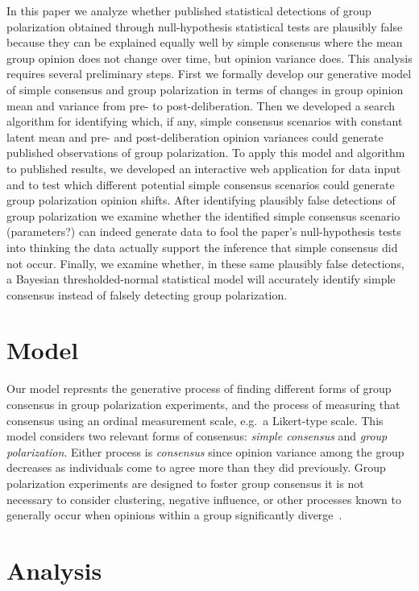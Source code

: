 \documentclass[letterpaper,man,natbib]{apa6}
\begin{document}
In this paper we analyze whether published statistical detections of group 
polarization obtained through null-hypothesis statistical tests
are plausibly false because they can be explained equally well by simple consensus
where the mean group opinion does not change over time, but opinion variance does.
This analysis requires several preliminary steps. 
First we formally develop our generative model of simple consensus and group 
polarization in terms of changes in group opinion mean and variance from 
pre- to post-deliberation. Then we developed a search algorithm for identifying 
which, if any, simple consensus scenarios with 
constant latent mean and pre- and post-deliberation opinion variances 
could generate published observations of group polarization. To apply this model
and algorithm to published results, we developed an interactive web application
for data input and to test which different potential simple consensus scenarios 
could generate group polarization opinion shifts. After identifying plausibly false
detections of group polarization we examine whether the identified simple
consensus scenario (parameters?) can indeed generate data to fool the 
paper's null-hypothesis tests into thinking the data actually support the inference
that simple consensus did not occur. Finally, we examine whether, in these same
plausibly false detections, a Bayesian thresholded-normal statistical model
will accurately identify simple consensus instead of falsely detecting group
polarization.

\section{Model}

Our model represnts the generative process of finding different forms of group consensus
in group polarization experiments, and the process of measuring that consensus using
an ordinal measurement scale, e.g.\ a Likert-type scale. This model considers two
relevant forms of consensus: \emph{simple consensus} and \emph{group polarization}.
Either process is \emph{consensus} since opinion variance among the group 
decreases as individuals come to agree more than they did previously. 
Group polarization experiments are designed to foster group consensus
it is not necessary to consider clustering, negative influence, or other
processes known to generally occur when opinions within a group significantly
diverge~\citep{Turner2018}.

\section{Analysis}
\end{document}
